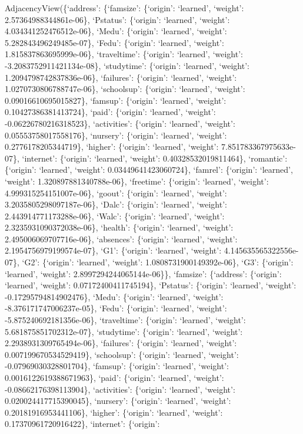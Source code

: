 \documentclass[
]{article}
\begin{document}
AdjacencyView(\{`address': \{`famsize': \{`origin': `learned', `weight':
2.57364988344861e-06\}, `Pstatus': \{`origin': `learned', `weight':
4.034341252476512e-06\}, `Medu': \{`origin': `learned', `weight':
5.282843496249485e-07\}, `Fedu': \{`origin': `learned', `weight':
1.815837863695999e-06\}, `traveltime': \{`origin': `learned', `weight':
-3.2083752911421134e-08\}, `studytime': \{`origin': `learned', `weight':
1.2094798742837836e-06\}, `failures': \{`origin': `learned', `weight':
1.0270730806788747e-06\}, `schoolsup': \{`origin': `learned', `weight':
0.09016610695015827\}, `famsup': \{`origin': `learned', `weight':
0.10427386381413724\}, `paid': \{`origin': `learned', `weight':
-0.06226780216318523\}, `activities': \{`origin': `learned', `weight':
0.05553758017558176\}, `nursery': \{`origin': `learned', `weight':
0.2776178205344719\}, `higher': \{`origin': `learned', `weight':
7.851783367975633e-07\}, `internet': \{`origin': `learned', `weight':
0.40328532019811464\}, `romantic': \{`origin': `learned', `weight':
0.03449641423060724\}, `famrel': \{`origin': `learned', `weight':
1.320897881340788e-06\}, `freetime': \{`origin': `learned', `weight':
4.999315254151007e-06\}, `goout': \{`origin': `learned', `weight':
3.2035805298097187e-06\}, `Dalc': \{`origin': `learned', `weight':
2.443914771173288e-06\}, `Walc': \{`origin': `learned', `weight':
2.3235931090372038e-06\}, `health': \{`origin': `learned', `weight':
2.495006069707716e-06\}, `absences': \{`origin': `learned', `weight':
2.1954756979199574e-07\}, `G1': \{`origin': `learned', `weight':
4.145635565322556e-07\}, `G2': \{`origin': `learned', `weight':
1.0808731900149392e-06\}, `G3': \{`origin': `learned', `weight':
2.8997294244065144e-06\}\}, `famsize': \{`address': \{`origin':
`learned', `weight': 0.07172400411745194\}, `Pstatus': \{`origin':
`learned', `weight': -0.17295794814902476\}, `Medu': \{`origin':
`learned', `weight': -8.376171747006237e-05\}, `Fedu': \{`origin':
`learned', `weight': -5.875240692181356e-06\}, `traveltime': \{`origin':
`learned', `weight': 5.681875851702312e-07\}, `studytime': \{`origin':
`learned', `weight': 2.2938931309765494e-06\}, `failures': \{`origin':
`learned', `weight': 0.007199670534529419\}, `schoolsup': \{`origin':
`learned', `weight': -0.07969030328801704\}, `famsup': \{`origin':
`learned', `weight': 0.0016122619388671963\}, `paid': \{`origin':
`learned', `weight': -0.08662176398113904\}, `activities': \{`origin':
`learned', `weight': 0.020024417715390045\}, `nursery': \{`origin':
`learned', `weight': 0.20181916953441106\}, `higher': \{`origin':
`learned', `weight': 0.17370961720916422\}, `internet': \{`origin':
\end{document}
